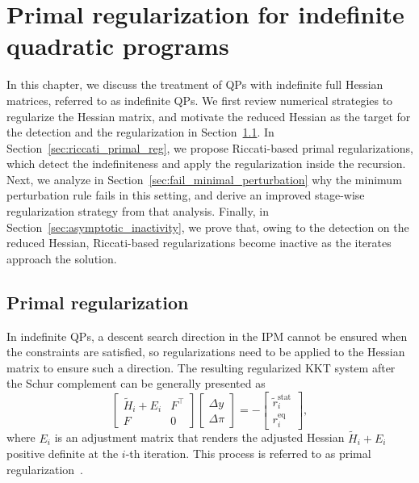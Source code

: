 \documentclass[class=scrbook, crop=false]{standalone}
\begin{document}
\chapter{Primal regularization for indefinite quadratic programs}
\label{Chapter::Primal_Regularization}
In this chapter, we discuss the treatment of \glspl{QP} with indefinite full Hessian matrices, 
referred to as indefinite \glspl{QP}.
We first review numerical strategies to regularize the Hessian matrix,
and motivate the reduced Hessian as the target for the detection and the regularization in Section~\ref{sec:hessian_reg}.
In Section~\ref{sec:riccati_primal_reg}, we propose Riccati-based primal regularizations,
which detect the indefiniteness and apply the regularization inside the recursion.
Next, we analyze in Section~\ref{sec:fail_minimal_perturbation} why the minimum perturbation rule fails in this setting,
and derive an improved stage-wise regularization strategy from that analysis.
Finally, in Section~\ref{sec:asymptotic_inactivity}, we prove that,
owing to the detection on the reduced Hessian, Riccati-based regularizations become inactive as the iterates approach the solution.

\section{Primal regularization}
\label{sec:hessian_reg}
In indefinite \glspl{QP}, 
a descent search direction in the \gls{IPM} cannot be ensured when the constraints are satisfied,
so regularizations need to be applied to the Hessian matrix to ensure such a direction.
The resulting regularized \gls{KKT} system after the Schur complement can be generally presented as
\begin{equation}
    \begin{bmatrix}
     \tilde{H}_i + E_i & F^\top \\
    F & 0
    \end{bmatrix}
    \begin{bmatrix}
    \Delta y \\
    \Delta \pi
    \end{bmatrix} = -
    \begin{bmatrix}
    \tilde{r}_i^{\mathrm{stat}} \\
    r_i^{\mathrm{eq}}
    \end{bmatrix},
\end{equation}
where $E_i$ is an adjustment matrix that renders the adjusted Hessian $\tilde{H}_i + E_i$ positive definite at the $i$-th iteration.
This process is referred to as primal regularization~\cite{wachter2006implementation}.
\end{document}

